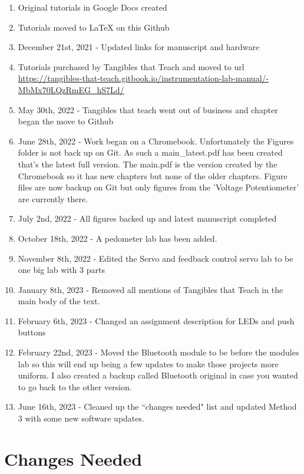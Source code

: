 \documentclass{article}
\begin{document}
\begin{enumerate}[itemsep=-5pt]
\item Original tutorials in Google Docs created
\item Tutorials moved to LaTeX on this Github
\item December 21st, 2021 - Updated links for manuscript and hardware
\item Tutorials purchased by Tangibles that Teach and moved to url \url{https://tangibles-that-teach.gitbook.io/instrumentation-lab-manual/-MbMx70LQzRmEG_hS7Ld/}
\item May 30th, 2022 - Tangibles that teach went out of business and
  chapter began the move to Github
\item June 28th, 2022 - Work began on a Chromebook. Unfortunately the
  Figures folder is not back up on Git. As such a main\_latest.pdf has
  been created that's the latest full version. The main.pdf is the
  version created by the Chromebook so it has new chapters but none of
  the older chapters. Figure files are now backup on Git but only
  figures from the 'Voltage Potentiometer' are currently there.
\item July 2nd, 2022 - All figures backed up and latest manuscript completed
\item October 18th, 2022 - A pedometer lab has been added.
\item November 8th, 2022 - Edited the Servo and feedback control servo
  lab to be one big lab with 3 parts
\item January 8th, 2023 - Removed all mentions of Tangibles that Teach
  in the main body of the text.
\item February 6th, 2023 - Changed an assignment description for LEDs
  and push buttons
\item February 22nd, 2023 - Moved the Bluetooth module to be before
  the modules lab so this will end up being a few updates to make
  those projects more uniform. I also created a backup called
  Bluetooth original in case you wanted to go back to the other version.
\item June 16th, 2023 - Cleaned up the ``changes needed" list and updated Method 3 with some new software updates. 
\end{enumerate}

\section*{Changes Needed}
\end{document}
